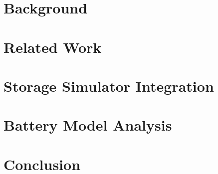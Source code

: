 \documentclass[11pt, a4paper]{report}
\begin{document}
\chapter{Background}
\label{background}


\chapter{Related Work}
\label{related_work}


\chapter{Storage Simulator Integration}
\label{integration}


\chapter{Battery Model Analysis}
\label{analysis}


\chapter{Conclusion}
\label{conclusion}




\end{document}
